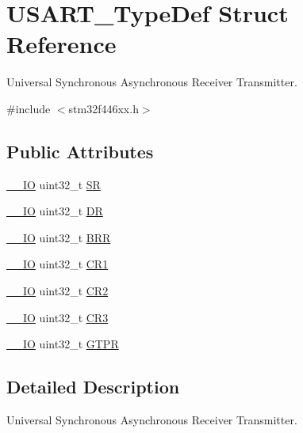 \hypertarget{struct_u_s_a_r_t___type_def}{}\section{U\+S\+A\+R\+T\+\_\+\+Type\+Def Struct Reference}
\label{struct_u_s_a_r_t___type_def}


Universal Synchronous Asynchronous Receiver Transmitter.  




{\ttfamily \#include $<$stm32f446xx.\+h$>$}

\subsection*{Public Attributes}
\begin{DoxyCompactItemize}
\item 
\hyperlink{core__sc300_8h_aec43007d9998a0a0e01faede4133d6be}{\+\_\+\+\_\+\+IO} uint32\+\_\+t \hyperlink{struct_u_s_a_r_t___type_def_a706005f59139b9ff8ee5755677e12bc7}{SR}
\item 
\hyperlink{core__sc300_8h_aec43007d9998a0a0e01faede4133d6be}{\+\_\+\+\_\+\+IO} uint32\+\_\+t \hyperlink{struct_u_s_a_r_t___type_def_a1db25b74d47af33dc4f4fe2177fc5da0}{DR}
\item 
\hyperlink{core__sc300_8h_aec43007d9998a0a0e01faede4133d6be}{\+\_\+\+\_\+\+IO} uint32\+\_\+t \hyperlink{struct_u_s_a_r_t___type_def_a6ef06ba9d8dc2dc2a0855766369fa7c9}{B\+RR}
\item 
\hyperlink{core__sc300_8h_aec43007d9998a0a0e01faede4133d6be}{\+\_\+\+\_\+\+IO} uint32\+\_\+t \hyperlink{struct_u_s_a_r_t___type_def_a6d7dcd3972a162627bc3470cbf992ec4}{C\+R1}
\item 
\hyperlink{core__sc300_8h_aec43007d9998a0a0e01faede4133d6be}{\+\_\+\+\_\+\+IO} uint32\+\_\+t \hyperlink{struct_u_s_a_r_t___type_def_aa7ede2de6204c3fc4bd9fb328801c99a}{C\+R2}
\item 
\hyperlink{core__sc300_8h_aec43007d9998a0a0e01faede4133d6be}{\+\_\+\+\_\+\+IO} uint32\+\_\+t \hyperlink{struct_u_s_a_r_t___type_def_af2991da9a4e1539530cd6b7b327199cc}{C\+R3}
\item 
\hyperlink{core__sc300_8h_aec43007d9998a0a0e01faede4133d6be}{\+\_\+\+\_\+\+IO} uint32\+\_\+t \hyperlink{struct_u_s_a_r_t___type_def_ae23acff49b4ff96fd29093e80fc7d72e}{G\+T\+PR}
\end{DoxyCompactItemize}


\subsection{Detailed Description}
Universal Synchronous Asynchronous Receiver Transmitter. 

